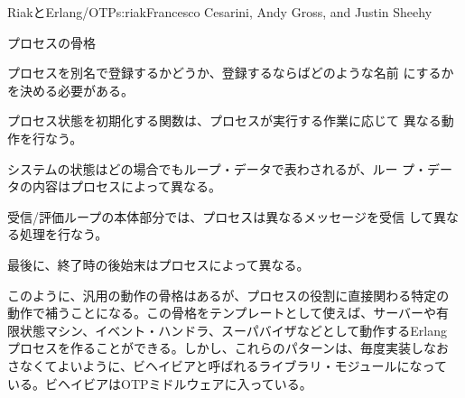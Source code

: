 \begin{aosachapter}{RiakとErlang/OTP}{s:riak}{Francesco Cesarini, Andy Gross, and Justin Sheehy}
\begin{aosasect1}{プロセスの骨格}
\begin{aosaitemize}
  \item プロセスを別名で登録するかどうか、登録するならばどのような名前
    にするかを決める必要がある。


  \item プロセス状態を初期化する関数は、プロセスが実行する作業に応じて
    異なる動作を行なう。


  \item システムの状態はどの場合でもループ・データで表わされるが、ルー
    プ・データの内容はプロセスによって異なる。


  \item 受信/評価ループの本体部分では、プロセスは異なるメッセージを受信
    して異なる処理を行なう。


  \item 最後に、終了時の後始末はプロセスによって異なる。

\end{aosaitemize}


このように、汎用の動作の骨格はあるが、プロセスの役割に直接関わる特定の
動作で補うことになる。この骨格をテンプレートとして使えば、サーバーや有
限状態マシン、イベント・ハンドラ、スーパバイザなどとして動作するErlang
プロセスを作ることができる。しかし、これらのパターンは、毎度実装しなお
さなくてよいように、ビヘイビアと呼ばれるライブラリ・モジュールになって
いる。ビヘイビアはOTPミドルウェアに入っている。


\end{aosasect1}
\end{aosachapter}
